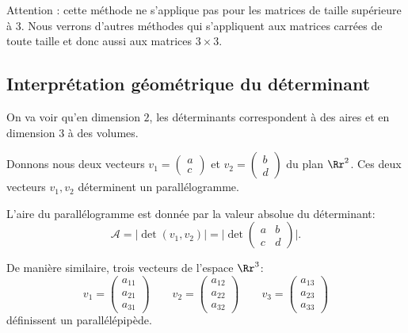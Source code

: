 \documentclass[class=report,crop=false]{standalone}
\begin{document}
Attention : cette méthode ne s'applique pas pour
les matrices de taille supérieure à $3$.
Nous verrons d'autres méthodes qui s'appliquent aux matrices carrées de toute taille
et donc aussi aux matrices $3\times3$.



\subsection{Interprétation géométrique du déterminant}


On va voir qu'en dimension $2$, les déterminants correspondent à des aires et
en dimension $3$ à des volumes.

Donnons nous deux vecteurs
$v_1= \left(\begin{smallmatrix}a\\c\end{smallmatrix}\right)$ et
$v_2= \left(\begin{smallmatrix}b\\d\end{smallmatrix}\right)$
du plan $\Rr^2$.
Ces deux vecteurs $v_1,v_2$ déterminent un parallélogramme.


\begin{proposition}\label{prop:aire}
L'aire du parallélogramme est donnée par la valeur absolue du déterminant:
$$\mathcal{A}
= \Big|\det(v_1,v_2)\Big|
= \Big|\det
\begin{pmatrix}
a & b \\
c & d
\end{pmatrix}\Big|
.$$
\end{proposition}

\bigskip

De manière similaire, trois vecteurs de l'espace $\Rr^3$:
$$
v_1=\begin{pmatrix}a_{11}\\a_{21}\\a_{31}\end{pmatrix} \qquad
v_2=\begin{pmatrix}a_{12}\\a_{22}\\a_{32}\end{pmatrix} \qquad
v_3=\begin{pmatrix}a_{13}\\a_{23}\\a_{33}\end{pmatrix}$$
définissent un parallélépipède.
\end{document}
